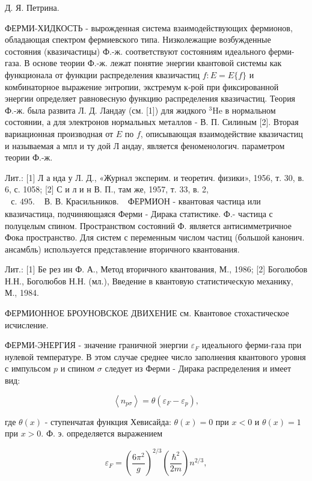 \documentclass[10pt]{article}
\begin{document}
Д. Я. Петрина.



ФЕРМИ-ХИДКОСТЬ - вырожденная система взаимодействующих фермионов, обладающая спектром фермиевского типа. Низколежащие возбужденные состояния (квазичастицы) Ф.-ж. соответствуют состояниям идеального ферми-газа. В основе теории Ф.-ж. лежат понятие энергии квантовой системы как функционала от функции распределения квазичастиц $f: E=E\{f\}$ и комбинаторное выражение энтропии, экстремум к-рой при фиксированной энергии определяет равновесную функцию распределения квазичастиц. Теория Ф.-ж. была развита Л. Д. Ландау (см. [1]) для жидкого ${ }^{3} \mathrm{He}$ в нормальном состоянии, а для электронов нормальных металлов - В. П. Силиным [2]. Вторая вариационная производная от $E$ по $f$, описывающая взаимодействие квазичастиц и называемая а мпл и ту дой Л андау, является феноменологич. параметром теории Ф.-ж.



Лит.: [1] Л а нда у Л. Д., «Журнал эксперим. и теоретич. физики», 1956, т. 30, в. 6, с. 1058; [2] С и л и н В. П., там же, 1957, т. 33, в. 2, $\begin{array}{ll}\text { с. } 495 . & \text { В. В. Красильников. }\end{array}$ ФЕРМИОН - квантовая частица или квазичастица, подчиняющаяся Ферми - Дирака статистике. Ф.- частица с полуцелым спином. Пространством состояний Ф. является антисимметричное Фока пространство. Для систем с переменным числом частиц (большой канонич. ансамбль) используется представление вторичного квантования.



Лит.: [1] Бе рез ин Ф. А., Метод вторичного квантования, М., 1986; [2] Боголюбов Н.Н., Боголюбов Н.Н. (мл.), Введение в квантовую статистическую механику, М., 1984.



ФЕРМИОННОЕ БРОУНОВСКОЕ ДВИХЕНИЕ см. Квантовое стохастическое исчисление.



ФЕРМИ-ЭНЕРГИЯ - значение граничной энергии $\varepsilon_{F}$ идеального ферми-газа при нулевой температуре. В этом случае среднее число заполнения квантового уровня с импульсом $p$ и спином $\sigma$ следует из Ферми - Дирака распределения и имеет вид:



\[

\left\langle n_{p \sigma}\right\rangle=\theta\left(\varepsilon_{F}-\varepsilon_{p}\right),

\]



где $\theta(x)$ - ступенчатая функция Хевисайда: $\theta(x)=0$ при $x<0$ и $\theta(x)=1$ при $x>0$. Ф. э. определяется выражением



\[

\varepsilon_{F}=\left(\frac{6 \pi^{2}}{g}\right)^{2 / 3}\left(\frac{\hbar^{2}}{2 m}\right) n^{2 / 3},

\]
\end{document}
